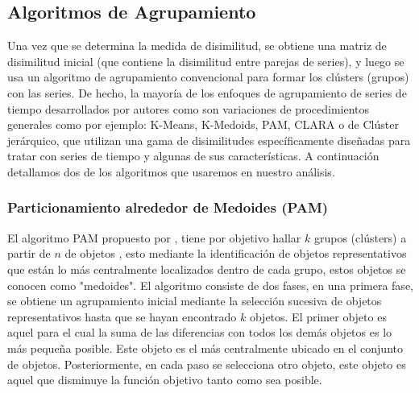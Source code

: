 \documentclass[12pt,oneside]{book}\usepackage[]{graphicx}\usepackage[]{color}
\theoremstyle{definition} %
\begin{document}

\subsection{Algoritmos de Agrupamiento}

Una vez que se determina la medida de disimilitud, se obtiene una matriz de disimilitud inicial (que contiene la disimilitud entre parejas de series), y luego se usa un algoritmo de agrupamiento convencional para formar los clústers (grupos) con las series. De hecho, la mayoría de los enfoques de agrupamiento de series de tiempo desarrollados por autores como \citeauthor{liao2005clustering} \citeyear{liao2005clustering} son variaciones de procedimientos generales como por ejemplo: K-Means, K-Medoids, PAM, CLARA \citeauthor{kaufman1986clustering} \citeyear{kaufman1986clustering} o de Clúster jerárquico, que utilizan una gama de disimilitudes específicamente diseñadas para tratar con series de tiempo y algunas de sus características. A continuación detallamos dos de los algoritmos que usaremos en nuestro análisis.

\subsubsection{Particionamiento alrededor de Medoides (PAM)}








El algoritmo PAM propuesto por \citeauthor{rousseeuw1990finding} \citeyear{rousseeuw1990finding}, tiene por objetivo hallar $k$ grupos (clústers) a partir de $n$ de objetos , esto mediante la identificación de objetos representativos que están lo más centralmente localizados dentro de cada grupo, estos objetos se conocen como "medoides". El algoritmo consiste de dos fases, en una primera fase, 
se obtiene un agrupamiento inicial mediante la selección sucesiva de objetos representativos hasta que se hayan encontrado $k$ objetos. El primer objeto es aquel para el cual la suma de las diferencias con todos los demás objetos es lo más pequeña posible. Este objeto es el más centralmente ubicado en el conjunto de objetos. Posteriormente, en cada paso se selecciona otro objeto, este objeto es aquel que disminuye la función objetivo tanto como sea posible. 
\end{document}
